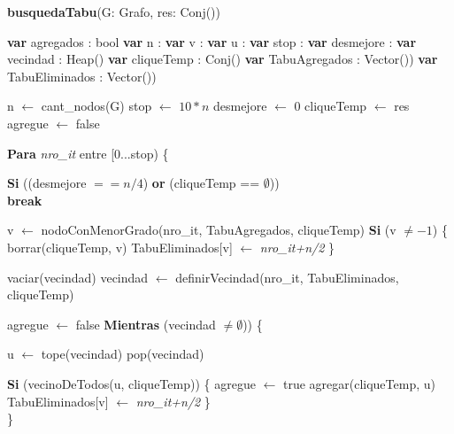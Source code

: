 \textbf{busquedaTabu}(G: Grafo, res: Conj(\entero)) \\
\begin{algorithm}[H]
\footnotesize 
\linesnumbered
\incmargin{3em}

	\BlankLine
	\textbf{var} agregados 		: bool		 										
	\textbf{var} n 				: \entero												{}
	\textbf{var} v 				: \entero												{}
	\textbf{var} u 				: \entero												{}
	\textbf{var} stop				: \entero					 							{}
	\textbf{var} desmejore		: \entero												{}
	\textbf{var} vecindad 		: Heap(\entero)							 			
	\textbf{var} cliqueTemp 		: Conj(\entero) 										
	\textbf{var} TabuAgregados 	: Vector(\entero))								 	
	\textbf{var} TabuEliminados 	: Vector(\entero)) 										
	
	\BlankLine \BlankLine
	n 				$\leftarrow$ cant\_nodos(G)											
	stop 			$\leftarrow$ $10*n$													
	desmejore 		$\leftarrow$ 0														
	cliqueTemp 		$\leftarrow$ res													
	agregue 		$\leftarrow$ false													

	\BlankLine \BlankLine		
	\textbf{Para} \textit{nro\_it} entre [0...stop) \{ 

	\BlankLine	
	\tab \textbf{Si} ((desmejore $== n/4$) \textbf{or} (cliqueTemp == $\emptyset$)) \\
	\tab \tab \textbf{break}

	\BlankLine \BlankLine				
	\tab v $\leftarrow$ nodoConMenorGrado(nro\_it, TabuAgregados, cliqueTemp)		
	\tab \textbf{Si} (v $\neq -1$) \{												
	\tab \tab borrar(cliqueTemp, v) 													
	\tab \tab TabuEliminados[v] $\leftarrow$ \textit{nro\_it+n/2} 					
	\tab \}

	\BlankLine \BlankLine		
	\tab vaciar(vecindad)																
	\tab vecindad $\leftarrow$ definirVecindad(nro\_it, TabuEliminados, cliqueTemp) 			

	\BlankLine \BlankLine		
	\tab agregue $\leftarrow$ false													
	\tab \textbf{Mientras} (vecindad $\neq \emptyset$)) \{							

	\BlankLine
	\tab \tab u $\leftarrow$ tope(vecindad)												
	\tab \tab pop(vecindad)																

	\BlankLine		
	\tab \tab \textbf{Si} (vecinoDeTodos(u, cliqueTemp)) \{ 							
	\tab \tab \tab agregue $\leftarrow$ true											
	\tab \tab \tab agregar(cliqueTemp, u) 												
	\tab \tab \tab TabuEliminados[v] $\leftarrow$ \textit{nro\_it+n/2}				
	\tab \tab \} \\
	\tab \}


\end{algorithm}

